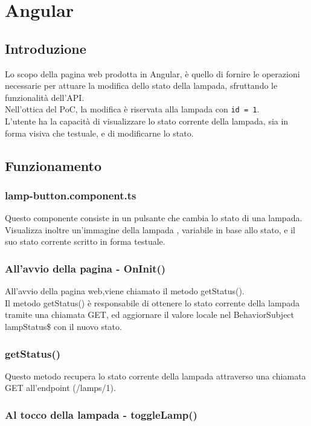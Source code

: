 \chapter{Angular}\label{angular}

\section{Introduzione}

Lo scopo della pagina web prodotta in Angular, è quello di fornire le operazioni necessarie per attuare la modifica dello stato della lampada, sfruttando le funzionalità dell'API. \\
Nell'ottica del PoC, la modifica è riservata alla lampada con \texttt{id = 1}. \\
L'utente ha la capacità di visualizzare lo stato corrente della lampada, sia in forma visiva che testuale, e di modificarne lo stato. 

\section{Funzionamento}

\subsection{lamp-button.component.ts}
Questo componente consiste in un pulsante che cambia lo stato di una lampada. Visualizza inoltre un'immagine della lampada , variabile in base allo stato, e il suo stato corrente scritto in forma testuale.

\subsection{All'avvio della pagina - OnInit()}
All'avvio della pagina web,viene chiamato il metodo getStatus().\\
Il metodo getStatus() è responsabile di ottenere lo stato corrente della lampada tramite una chiamata GET, ed aggiornare il valore locale nel BehaviorSubject lampStatus\$ con il nuovo stato.

\subsection{getStatus()}
Questo metodo recupera lo stato corrente della lampada attraverso una chiamata GET all'endpoint (/lamps/1). \\

\subsection{Al tocco della lampada - toggleLamp()}

